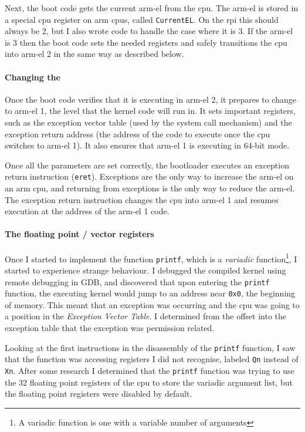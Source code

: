 \documentclass{article}
\begin{document}
Next, the boot code gets the current \gls{arm-el} from the \gls{cpu}. The
\gls{arm-el} is stored in a special \gls{cpu} register on \gls{arm}
\glspl{cpu}, called \verb!CurrentEL!. On the \gls{rpi} this should always be 2,
but I also wrote code to handle the case where it is 3. If the \gls{arm-el} is
3 then the boot code sets the needed registers and safely transitions the
\gls{cpu} into \gls{arm-el} 2 in the same way as described below.

\paragraph{Changing the \texorpdfstring{}{Exception Level}}
Once the boot code verifies that it is executing in \gls{arm-el} 2, it prepares
to change to \gls{arm-el} 1, the level that the kernel code will run in. It
sets important registers, such as the exception vector table (used by the
system call mechanism) and the exception return address (the address of the
code to execute once the \gls{cpu} switches to \gls{arm-el} 1). It also ensures
that \gls{arm-el} 1 is executing in 64-bit mode.

Once all the parameters are set correctly, the bootloader executes an exception
return instruction (\verb!eret!). Exceptions are the only way to increase the
\gls{arm-el} on an \gls{arm} \gls{cpu}, and returning from exceptions is the
only way to reduce the \gls{arm-el}. The exception return instruction changes
the \gls{cpu} into \gls{arm-el} 1 and resumes execution at the address of the
\gls{arm-el} 1 code.

\paragraph{The floating point / vector registers}
Once I started to implement the function \verb!printf!, which is a
\emph{variadic} function\footnote{A variadic function is one with a variable
number of arguments}, I started to experience strange behaviour. I debugged the
compiled kernel using remote debugging in GDB, and discovered that upon
entering the \verb!printf! function, the executing kernel would jump to an
address near \texttt{0x0}, the beginning of memory. This meant that an
exception was occurring and the \gls{cpu} was going to a position in the
\emph{Exception Vector Table}. I determined from the offset into the exception
table that the exception was permission related.

Looking at the first instructions in the disassembly of the \verb!printf!
function, I saw that the function was accessing registers I did not recognise,
labeled \texttt{Qn} instead of \texttt{Xn}. After some research I determined
that the \verb!printf! function was trying to use the 32 floating point
registers of the \gls{cpu} to store the variadic argument list, but the
floating point registers were disabled by default.
\end{document}
